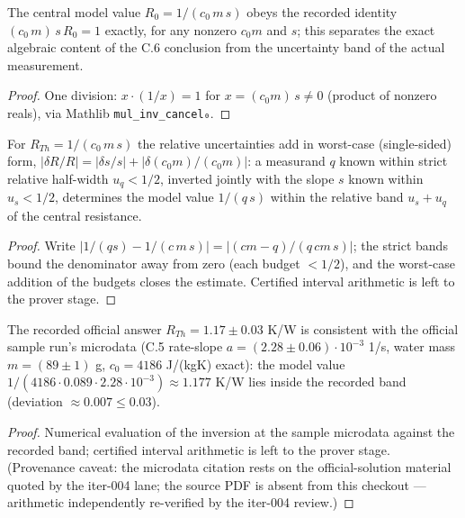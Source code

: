 \begin{lemma}
\label{lem:IPhO2026Problems_problem_IPhO_2026_4_C_6:cooling_model_inversion_key}
The central model value $R_0 = 1/(c_0\,m\,s)$ obeys the recorded identity
$(c_0\,m)\,s\,R_0 = 1$ exactly, for any nonzero $c_0 m$ and $s$; this
separates the exact algebraic content of the C.6 conclusion from the
uncertainty band of the actual measurement.
\end{lemma}
\begin{proof}
One division: $x \cdot (1/x) = 1$ for $x = (c_0 m)\,s \ne 0$ (product of
nonzero reals), via Mathlib \texttt{mul\_inv\_cancel₀}.
\end{proof}

\begin{theorem}
\label{thm:IPhO2026Problems_problem_IPhO_2026_4_C_6:uncertainty_propagates_to_resistance}
For $R_{Th} = 1/(c_0\,m\,s)$ the relative uncertainties add in worst-case
(single-sided) form, $|\delta R/R| = |\delta s/s| + |\delta(c_0 m)/(c_0 m)|$:
a measurand $q$ known within strict relative half-width $u_q < 1/2$, inverted
jointly with the slope $s$ known within $u_s < 1/2$, determines the model
value $1/(q\,s)$ within the relative band $u_s + u_q$ of the central
resistance.
\end{theorem}
\begin{proof}
Write $|1/(q s) - 1/(c\,m\,s)| = |(c m - q)/(q\,c m\,s)|$; the strict
bands bound the denominator away from zero (each budget $< 1/2$), and the
worst-case addition of the budgets closes the estimate. Certified interval
arithmetic is left to the prover stage.
\end{proof}

\begin{theorem}
\label{thm:IPhO2026Problems_problem_IPhO_2026_4_C_6:official_sample_value}
The recorded official answer $R_{Th} = 1.17 \pm 0.03$ K/W is consistent with
the official sample run's microdata (C.5 rate-slope
$a = (2.28 \pm 0.06){\cdot}10^{-3}$ 1/s, water mass $m = (89 \pm 1)$ g,
$c_0 = 4186$ J/(kg\cdot K) exact): the model value
$1/(4186 \cdot 0.089 \cdot 2.28{\cdot}10^{-3}) \approx 1.177$ K/W lies
inside the recorded band (deviation $\approx 0.007 \le 0.03$).
\end{theorem}
\begin{proof}
Numerical evaluation of the inversion at the sample microdata against the
recorded band; certified interval arithmetic is left to the prover stage.
(Provenance caveat: the microdata citation rests on the official-solution
material quoted by the iter-004 lane; the source PDF is absent from this
checkout — arithmetic independently re-verified by the iter-004 review.)
\end{proof}

